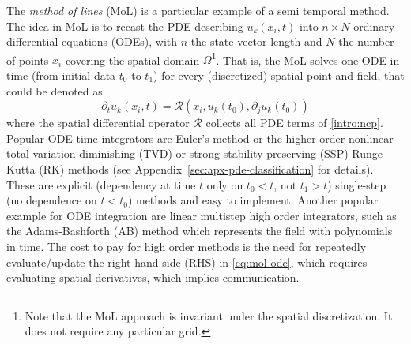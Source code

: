 The \emph{method of lines} (MoL) is a particular example of a semi
temporal method. The idea in MoL is 
to recast the PDE describing $u_k(x_i,t)$ into  $n\times N$
ordinary differential equations (ODEs), with $n$ the
state vector length and $N$ the number of points $x_i$ covering the spatial domain
$\Omega$\footnote{
	Note that the MoL approach is invariant under the spatial discretization.
	It does not require any particular grid.
}. That is, the MoL solves one ODE in time (from initial data $t_0$ to $t_1$) 
for every (discretized) spatial point and field, that could be denoted as
\begin{equation}\label{eq:mol-ode}
\partial_t u_k(x_i, t) = \mathcal R(x_i, u_k(t_0), \partial_j u_k(t_0))
\end{equation}
where the spatial differential operator $\mathcal R$ collects all PDE terms
of \eqref{intro:ncp}.
Popular ODE time integrators are Euler's method or the higher order nonlinear
total-variation diminishing (TVD) or 
strong stability preserving (SSP) Runge-Kutta (RK) methods (see
Appendix~\ref{sec:apx-pde-classification} for details). These are explicit
(dependency at time $t$ only on $t_0 < t$, not $t_1 > t$) single-step
(no dependence on $t<t_0$) methods and easy to implement. 
Another popular example for ODE integration are linear multistep high order
integrators, such as the Adams-Bashforth (AB) method which represents the field
with polynomials in time.
The cost to pay for high order methods is the need for repeatedly
evaluate/update the right hand side (RHS) in \eqref{eq:mol-ode},
which requires evaluating spatial
derivatives, which implies communication.


